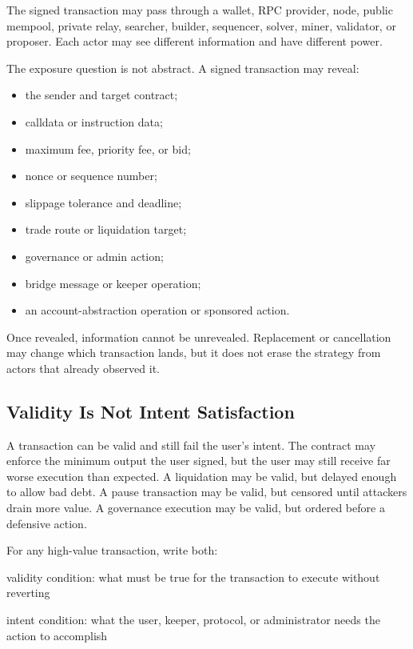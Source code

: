 The signed transaction may pass through a wallet, RPC provider, node, public mempool, private relay, searcher, builder, sequencer, solver, miner, validator, or proposer. Each actor may see different information and have different power.

The exposure question is not abstract. A signed transaction may reveal:

\begin{itemize}
\item the sender and target contract;
\item calldata or instruction data;
\item maximum fee, priority fee, or bid;
\item nonce or sequence number;
\item slippage tolerance and deadline;
\item trade route or liquidation target;
\item governance or admin action;
\item bridge message or keeper operation;
\item an account-abstraction operation or sponsored action.
\end{itemize}

Once revealed, information cannot be unrevealed. Replacement or cancellation may change which transaction lands, but it does not erase the strategy from actors that already observed it.

\subsection{Validity Is Not Intent Satisfaction}

A transaction can be valid and still fail the user's intent. The contract may enforce the minimum output the user signed, but the user may still receive far worse execution than expected. A liquidation may be valid, but delayed enough to allow bad debt. A pause transaction may be valid, but censored until attackers drain more value. A governance execution may be valid, but ordered before a defensive action.

For any high-value transaction, write both:

\begin{codeblock}
validity condition:
    what must be true for the transaction to execute without reverting

intent condition:
    what the user, keeper, protocol, or administrator needs the action
    to accomplish
\end{codeblock}

